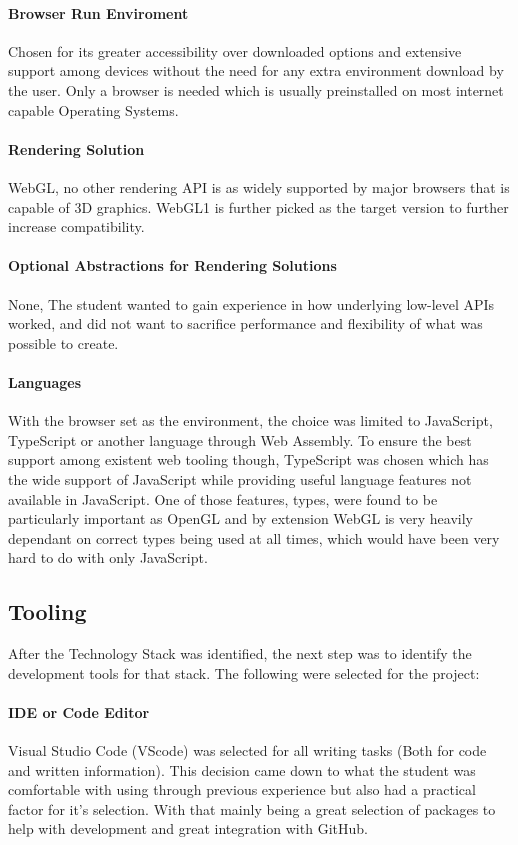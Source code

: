 \paragraph{Browser Run Enviroment}
Chosen for its greater accessibility over downloaded options and extensive support among devices without the need for any extra environment download by the user. Only a browser is needed which is usually preinstalled on most internet capable Operating Systems.

\paragraph{Rendering Solution}
WebGL, no other rendering API is as widely supported by major browsers that is capable of 3D graphics. WebGL1 is further picked as the target version to further increase compatibility.

\paragraph{Optional Abstractions for Rendering Solutions}
None, The student wanted to gain experience in how underlying low-level APIs worked, and did not want to sacrifice performance and flexibility of what was possible to create.

\paragraph{Languages}
With the browser set as the environment, the choice was limited to JavaScript, TypeScript or another language through Web Assembly. To ensure the best support among existent web tooling though, TypeScript was chosen which has the wide support of JavaScript while providing useful language features not available in JavaScript. One of those features, types, were found to be particularly important as OpenGL and by extension WebGL is very heavily dependant on correct types being used at all times, which would have been very hard to do with only JavaScript.

\subsection{Tooling}
After the Technology Stack was identified, the next step was to identify the development tools for that stack. The following were selected for the project:

\paragraph{IDE or Code Editor}
Visual Studio Code (VScode) was selected for all writing tasks (Both for code and written information). This decision came down to what the student was comfortable with using through previous experience but also had a practical factor for it's selection. With that mainly being a great selection of packages to help with development and great integration with GitHub.

